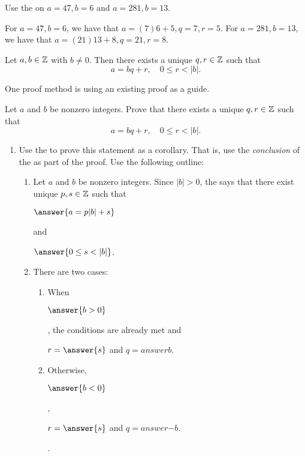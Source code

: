 \documentclass{ximera}
\begin{document}
\begin{br}
 Use the  on $a=47, b=6$ and $a=281, b=13$.
\end{br}
\begin{solution}
For $a=47, b=6$, we have that $a=(7)6+5, q=7, r=5$.
For $a=281, b=13$, we have that $a=(21)13+8, q=21, r=8$.
\end{solution}

\begin{corollary}
 Let $a,b\in\mathbb Z$ with $b\neq0$. Then there exists a unique $q,r\in\mathbb Z$ such that \[a=bq+r, \quad 0\leq r <|b|.\]
\end{corollary}
One proof method is using an existing proof as a guide.

\begin{br} Let $a$ and $b$ be nonzero integers. Prove that there exists a unique $q,r\in\mathbb Z$ such that 
  \[a=bq+r, \quad 0\leq r <|b|.\]
  \begin{enumerate}
    	\item Use the  to prove this statement as a corollary. That is, use the \emph{conclusion} of the  as part of the proof.  Use the following outline:
    	\begin{enumerate}
		\item  Let $a$ and $b$ be nonzero integers. Since $|b|>0$, the  says that there exist unique $p,s\in\mathbb Z$ such that 
		\begin{prompt}
			$\answer{a=p|b|+s}$
		\end{prompt} and 
		\begin{prompt}
			$\answer{0\leq s<|b|}$.
		\end{prompt}
      		\item There are two cases:
      		\begin{enumerate}
        			\item When 
					\begin{prompt}
						$\answer{b>0}$
					\end{prompt}, the conditions are already met and 
					\begin{prompt}
						$r=\answer{s}$ and $q=answer{b}$.
					\end{prompt}
        			\item Otherwise, 
					\begin{prompt}
						$\answer{b<0}$
					\end{prompt}, \begin{prompt}
						$r=\answer{s}$ and $q=answer{-b}$.
					\end{prompt}.

\end{enumerate}
\end{enumerate}
\end{enumerate}
\end{br}
\end{document}
